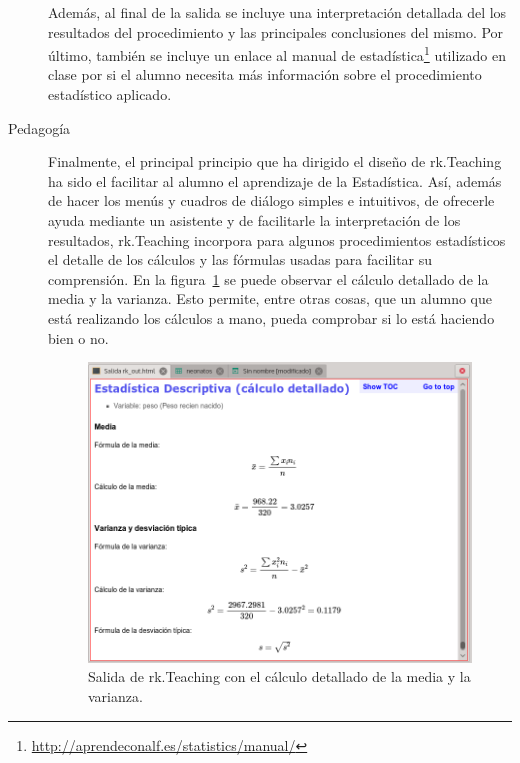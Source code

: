 \documentclass[a4paper,10pt,twoside]{article}
\newcommand{\rkteaching}{\textsf{rk.Teaching}}
\begin{document}
\begin{description}
Además, al final de la salida se incluye una interpretación detallada del los resultados del procedimiento y las
principales conclusiones del mismo.
Por último, también se incluye un enlace al manual de estadística\footnote{\url{http://aprendeconalf.es/statistics/manual/}} utilizado en
clase por si el alumno necesita más información sobre el procedimiento estadístico aplicado. 

\item[Pedagogía] Finalmente, el principal principio que ha dirigido el diseño de \rkteaching{} ha sido el facilitar al
alumno el aprendizaje de la Estadística.
Así, además de hacer los menús y cuadros de diálogo simples e intuitivos, de ofrecerle ayuda mediante un asistente y de
facilitarle la interpretación de los resultados, \rkteaching{} incorpora para algunos procedimientos estadísticos el
detalle de los cálculos y las fórmulas usadas para facilitar su comprensión.
En la figura~\ref{f:calculo-detallado} se puede observar el cálculo detallado de la media y la varianza.
Esto permite, entre otras cosas, que un alumno que está realizando los cálculos a mano, pueda comprobar si lo está
haciendo bien o no.

\begin{figure}[htp]
\begin{center}
\includegraphics[width=\textwidth]{img/calculo_detallado.png}
\caption{Salida de \rkteaching{} con el cálculo detallado de la media y la varianza.}
\label{f:calculo-detallado}
\end{center}
\end{figure}


\end{description}
\end{document}
